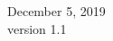 \begin{titlepage}


{\large December 5, 2019}\\[0.5cm] %
{\large version 1.1}\\[2cm]
 

\vfill %
\clearpage
\end{titlepage}
